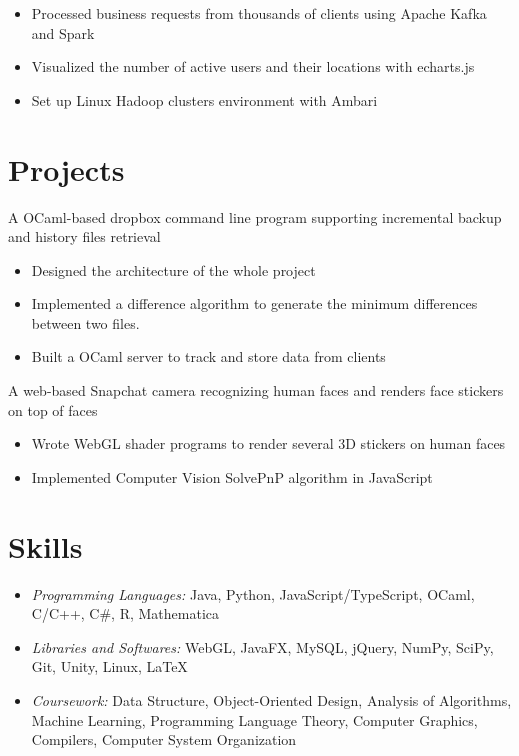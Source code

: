 \documentclass{resume}
\begin{document}
\begin{itemize}
  \item Processed business requests from thousands of clients using Apache Kafka and Spark
  \item Visualized the number of active users and their locations with echarts.js
  \item Set up Linux Hadoop clusters environment with Ambari
\end{itemize}

\section{Projects}
A OCaml-based dropbox command line program supporting incremental backup and history files retrieval
\begin{itemize}
  \item Designed the architecture of the whole project
  \item Implemented a difference algorithm to generate the minimum differences between two files.
  \item Built a OCaml server to track and store data from clients
\end{itemize}
A web-based Snapchat camera recognizing human faces and renders face stickers on top of faces
\begin{itemize}
  \item Wrote WebGL shader programs to render several 3D stickers on human faces
  \item Implemented Computer Vision SolvePnP algorithm in JavaScript
\end{itemize}

\section{Skills}
\begin{itemize}[parsep=0.5ex]
  \item \textit{Programming Languages:} Java, Python, JavaScript/TypeScript, OCaml, C/C++, C\#, R, Mathematica
  \item \textit{Libraries and Softwares:} WebGL, JavaFX, MySQL, jQuery, NumPy, SciPy, Git, Unity, Linux, \LaTeX
  \item \textit{Coursework: }Data Structure, Object-Oriented Design, Analysis of Algorithms, Machine Learning, Programming Language Theory, Computer Graphics, Compilers, Computer System Organization
\end{itemize}
\end{document}
